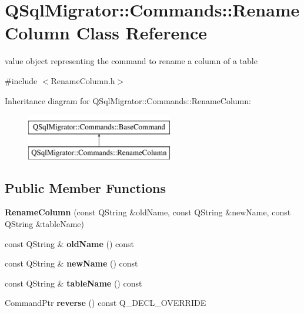 \hypertarget{class_q_sql_migrator_1_1_commands_1_1_rename_column}{}\section{Q\+Sql\+Migrator\+:\+:Commands\+:\+:Rename\+Column Class Reference}
\label{class_q_sql_migrator_1_1_commands_1_1_rename_column}


value object representing the command to rename a column of a table  




{\ttfamily \#include $<$Rename\+Column.\+h$>$}

Inheritance diagram for Q\+Sql\+Migrator\+:\+:Commands\+:\+:Rename\+Column\+:\begin{figure}[H]
\begin{center}
\leavevmode
\includegraphics[height=2.000000cm]{class_q_sql_migrator_1_1_commands_1_1_rename_column}
\end{center}
\end{figure}
\subsection*{Public Member Functions}
\begin{DoxyCompactItemize}
\item 
\mbox{\label{class_q_sql_migrator_1_1_commands_1_1_rename_column_addebc4a6f640d8290e29c4d5eaeb7061}} 
{\bfseries Rename\+Column} (const Q\+String \&old\+Name, const Q\+String \&new\+Name, const Q\+String \&table\+Name)
\item 
\mbox{\label{class_q_sql_migrator_1_1_commands_1_1_rename_column_a9195153e0befc7ec69a9c3eee0d93c4e}} 
const Q\+String \& {\bfseries old\+Name} () const
\item 
\mbox{\label{class_q_sql_migrator_1_1_commands_1_1_rename_column_a5e74db6d6ef02e39446c437289d531df}} 
const Q\+String \& {\bfseries new\+Name} () const
\item 
\mbox{\label{class_q_sql_migrator_1_1_commands_1_1_rename_column_a3763391fcab7b27bd42d354bc45e7a70}} 
const Q\+String \& {\bfseries table\+Name} () const
\item 
\mbox{\label{class_q_sql_migrator_1_1_commands_1_1_rename_column_a22b69a5f16dba9628f898fa1ff75ef66}} 
Command\+Ptr {\bfseries reverse} () const Q\+\_\+\+D\+E\+C\+L\+\_\+\+O\+V\+E\+R\+R\+I\+DE
\end{DoxyCompactItemize}
